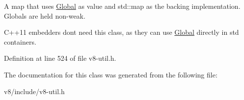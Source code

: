 A map that uses \mbox{\hyperlink{classv8_1_1Global}{Global}} as value and std\+::map as the backing implementation. Globals are held non-\/weak.

C++11 embedders don\textquotesingle{}t need this class, as they can use \mbox{\hyperlink{classv8_1_1Global}{Global}} directly in std containers. 

Definition at line 524 of file v8-\/util.\+h.



The documentation for this class was generated from the following file\+:\begin{DoxyCompactItemize}
\item 
v8/include/v8-\/util.\+h\end{DoxyCompactItemize}
